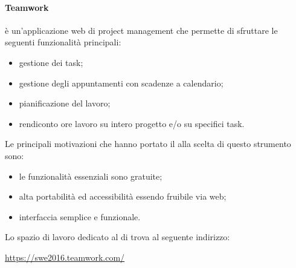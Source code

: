             \paragraph{Teamwork}\label{sec:teamwork}
             è un'applicazione web di project management che permette di sfruttare le seguenti funzionalità principali:
            \begin{itemize}
            	\item gestione dei task;
            	\item gestione degli appuntamenti con scadenze a calendario;
            	\item pianificazione del lavoro;
            	\item rendiconto ore lavoro su intero progetto e/o su specifici task.
            \end{itemize}
            Le principali motivazioni che hanno portato il  alla scelta di questo strumento sono:
            \begin{itemize}
            	\item le funzionalità essenziali sono gratuite;
            	\item alta portabilità ed accessibilità essendo fruibile via web;
            	\item interfaccia semplice e funzionale.
            \end{itemize}
            Lo spazio di lavoro dedicato al  di trova al seguente indirizzo:
            \begin{center}
            	\url{https://swe2016.teamwork.com/}
            \end{center}

